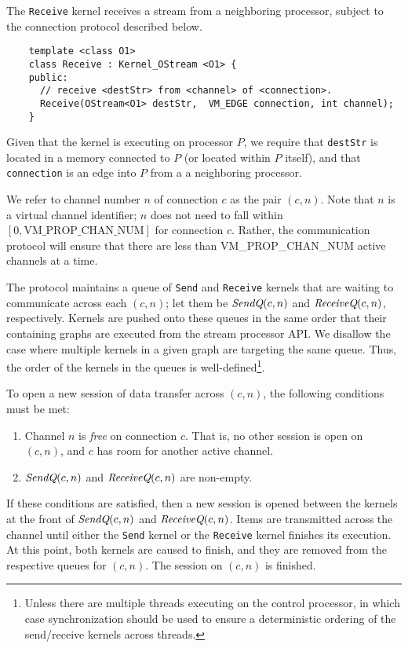  The {\tt Receive} kernel receives a stream from a
neighboring processor, subject to the connection protocol described
below.  
{\small
\begin{verbatim}
    template <class O1>
    class Receive : Kernel_OStream <O1> {
    public:
      // receive <destStr> from <channel> of <connection>.
      Receive(OStream<O1> destStr,  VM_EDGE connection, int channel);
    }  
\end{verbatim}}

Given that the kernel is executing on processor $P$, we require that
{\tt destStr} is located in a memory connected to $P$ (or located
within $P$ itself), and that {\tt connection} is an edge into $P$ from
a a neighboring processor.

 We refer to channel number $n$ of connection $c$ as the pair $(c,
n)$.  Note that $n$ is a virtual channel identifier; $n$ does not need to fall within $[0,
\mbox{VM\_PROP\_CHAN\_NUM}]$ for connection $c$.  Rather, the communication protocol will
ensure that there are less than VM\_PROP\_CHAN\_NUM active channels at a time.

The protocol maintains a queue of {\tt Send} and {\tt Receive} kernels that are waiting to
communicate across each $(c, n)$; let them be $\mbox{\it SendQ}(c, n)$ and $\mbox{\it ReceiveQ}(c, n)$,
respectively.  Kernels are pushed onto these queues in the same order that their containing
graphs are executed from the stream processor API.  We disallow the case where multiple kernels
in a given graph are targeting the same queue.  Thus, the order of the kernels in the queues is
well-defined\footnote{Unless there are multiple threads executing on the control processor, in
which case synchronization should be used to ensure a deterministic ordering of the
send/receive kernels across threads.}.

To open a new session of data transfer across $(c, n)$, the following conditions must be met:
\begin{enumerate}

\item Channel $n$ is {\it free} on connection $c$.  That is, no other
session is open on $(c, n)$, and $c$ has room for another active
channel.

\item $\mbox{\it SendQ}(c, n)$ and $\mbox{\it ReceiveQ}(c, n)$ are non-empty.

\end{enumerate}
If these conditions are satisfied, then a new session is opened between the kernels at the
front of $\mbox{\it SendQ}(c, n)$ and $\mbox{\it ReceiveQ}(c, n)$.  Items are transmitted across the
channel until either the {\tt Send} kernel or the {\tt Receive} kernel finishes its execution.
At this point, both kernels are caused to finish, and they are removed from the respective
queues for $(c, n)$.  The session on $(c, n)$ is finished.

